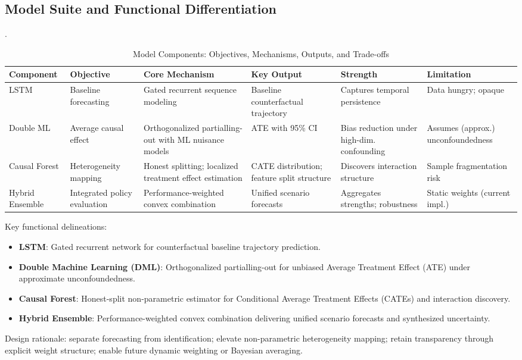 \subsection{Model Suite and Functional Differentiation}
.
\begin{table}[H]
\centering
\small
\caption{Model Components: Objectives, Mechanisms, Outputs, and Trade-offs}
\label{tab:model_comparison}
\setlength{\tabcolsep}{4pt}
\renewcommand{\arraystretch}{1.12}
\begin{tabular}{|p{2.2cm}|p{2.3cm}|p{3.0cm}|p{2.5cm}|p{2.3cm}|p{2.4cm}|}
\hline
\textbf{Component} & \textbf{Objective} & \textbf{Core Mechanism} & \textbf{Key Output} & \textbf{Strength} & \textbf{Limitation} \\
\hline
LSTM & Baseline forecasting & Gated recurrent sequence modeling & Baseline counterfactual trajectory & Captures temporal persistence & Data hungry; opaque \\
\hline
Double ML & Average causal effect & Orthogonalized partialling-out with ML nuisance models & ATE with 95\% CI & Bias reduction under high-dim. confounding & Assumes (approx.) unconfoundedness \\
\hline
Causal Forest & Heterogeneity mapping & Honest splitting; localized treatment effect estimation & CATE distribution; feature split structure & Discovers interaction structure & Sample fragmentation risk \\
\hline
Hybrid Ensemble & Integrated policy evaluation & Performance-weighted convex combination & Unified scenario forecasts & Aggregates strengths; robustness & Static weights (current impl.) \\
\hline
\end{tabular}
\end{table}
Key functional delineations:
\begin{itemize}
  \item \textbf{LSTM}: Gated recurrent network for counterfactual baseline trajectory prediction.
  \item \textbf{Double Machine Learning (DML)}: Orthogonalized partialling-out for unbiased Average Treatment Effect (ATE) under approximate unconfoundedness.
  \item \textbf{Causal Forest}: Honest-split non-parametric estimator for Conditional Average Treatment Effects (CATEs) and interaction discovery.
  \item \textbf{Hybrid Ensemble}: Performance-weighted convex combination delivering unified scenario forecasts and synthesized uncertainty.
\end{itemize}
Design rationale: separate forecasting from identification; elevate non-parametric heterogeneity mapping; retain transparency through explicit weight structure; enable future dynamic weighting or Bayesian averaging.

